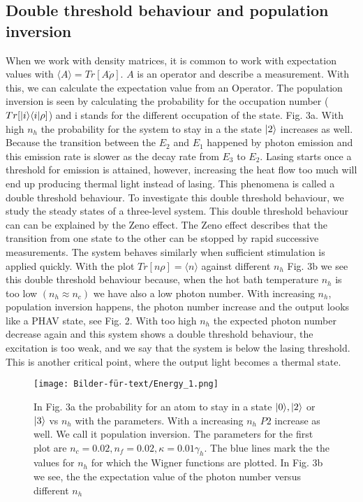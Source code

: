 \documentclass[12pt,a4paper]{article}
\DeclarePairedDelimiter\bra{\langle}{\rvert}
\DeclarePairedDelimiter\ket{\lvert}{\rangle}
\begin{document}
\newpage
\subsection{Double threshold behaviour and population inversion}
 When we work with density matrices, it is common to work with expectation values with $\langle A \rangle=Tr[A\dot{\rho}]$.
 $A$ is an operator and describe a measurement.
With this, we can calculate the expectation value from an Operator. 
The population inversion is seen by calculating the probability for the occupation number ($Tr[\ket{i}\bra{i} \rho]$) and i stands for the different occupation of the state. Fig. 3a.  With high $n_h$ the probability for the system to stay in a the state $\ket{2}$ increases as well. Because the transition between the $E_2$ and $E_1$ happened by photon emission and this emission rate is slower as the decay rate from $E_3$ to $E_2$. 
Lasing starts once a threshold for emission is attained, however, increasing the heat flow too much will end up producing  thermal light instead of lasing. This phenomena is called a double threshold behaviour.\cite{Li2017}
To investigate this double threshold behaviour, we study the steady states of a three-level system.
This double threshold behaviour can can be explained by the Zeno effect. 
The Zeno effect describes that the transition from one state to the other can be stopped by rapid successive measurements. 
The system behaves similarly when sufficient stimulation is applied quickly. 
With the plot  $Tr[n\rho] =\langle n\rangle$ against different $n_h$ Fig. 3b we see this double threshold behaviour because, when the hot bath temperature $n_h$ is too low $(n_h \approx n_c)$ we have also a  low photon number. With increasing $n_h$, population inversion happens, the photon number increase and the output looks like a PHAV state,  see  Fig. 2. With too high $n_h$ the expected photon number decrease again and this system shows a double threshold behaviour, the excitation is too weak, and we say that the system is below the lasing threshold. This is another critical point, where the output light becomes a thermal state.
\begin{figure}[h!]
\hspace{-1cm}
\texttt{[image: Bilder-für-text/Energy\_1.png]}
\caption{In Fig. 3a the probability for an atom to stay in a state $\ket{0}, \ket{2}$ or $\ket{3}$ vs $n_h$ with the parameters. With a increasing $n_h$ $P2$ increase as well. We call it population inversion.  The parameters for the first plot are $n_c=0.02 ,n_f=0.02,\kappa=0.01\gamma_h $. The blue lines mark the the values for $ n_h$ for which the Wigner functions are plotted. In Fig. 3b we see, the the expectation value of the photon number versus different $n_h$ }
\end{figure}
\end{document}
